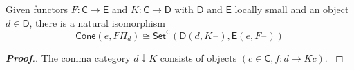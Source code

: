 \documentclass[a4paper]{article}
\date{November 9, 2023}
\begin{document}
\maketitle
\par{  Given functors \(F :  \mathsf{C}   \to   \mathsf{E}\) and \(K :  \mathsf{C}   \to   \mathsf{D}\) with \(\mathsf{D}\) and \(\mathsf{E}\) locally small and an object \(d  \in   \mathsf{D}\), there is a natural isomorphism
  \[\mathsf{Cone} ( e , F \Pi _{d} )   \cong   \mathsf{Set} ^{ \mathsf{C} }( \mathsf{D} ( d , K \mathord{\hspace{1pt} \text{--} \hspace{1pt}} ) , \mathsf{E} ( e , F \mathord{\hspace{1pt} \text{--} \hspace{1pt}} ) )\]}  \begin{proof}[{\textbf{Proof}.}]
  \par{    The comma category \({ d } \downarrow{K}\) consists of objects \((c  \in   \mathsf{C} , f : d  \to  Kc)\).
  }    \qedhere{}\end{proof}

\printbibliography
\end{document}
